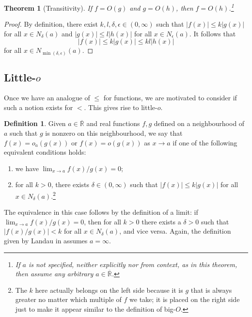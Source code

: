\documentclass{article}
\newtheorem{theorem}{Theorem}
\theoremstyle{definition}
\newtheorem{definition}{Definition}
\newcommand\RRE{\overline{\mathbb R}}
\newcommand\abs[1]{\left\lvert#1\right\rvert}
\begin{document}
\begin{theorem}[Transitivity]
    If \(f = O(g)\) and \(g = O(h)\), then \(f = O(h)\).\footnote{If \(a\) is not specified, neither explicitly nor from context, as in this theorem, then assume any arbitrary \(a\in\RRE\).}
\end{theorem}

\begin{proof}
    By definition, there exist \(k,l,\delta,\epsilon\in(0,\infty)\) such that \(\abs{f(x)} \leq k\abs{g(x)}\) for all \(x\in N_{\delta}(a)\) and \(\abs{g(x)} \leq l\abs{h(x)}\) for all \(x\in N_{\epsilon}(a)\).
    It follows that
    \[\abs{f(x)} \leq k\abs{g(x)} \leq kl\abs{h(x)}\]
    for all \(x\in N_{\min(\delta,\epsilon)}(a)\).
\end{proof}

\subsection{Little-$o$}\label{ssec:littleo}

Once we have an analogue of \(\leq\) for functions, we are motivated to consider if such a notion exists for \(<\).
This gives rise to little-\(o\).

\begin{definition}
    Given \(a\in\RRE\) and real functions \(f,g\) defined on a neighbourhood of \(a\) such that \(g\) is nonzero on this neighbourhood, we say that \(f(x) = o_a(g(x))\) or \(f(x) = o(g(x))\) as \(x\to a\) if one of the following equivalent conditions holds:
    \begin{enumerate}
        \item we have \(\lim_{x\to a} f(x)/g(x) = 0\);
        \item for all \(k>0\), there exists \(\delta\in(0,\infty)\) such that \(\abs{f(x)} \leq k\abs{g(x)}\) for all \(x\in N_{\delta}(a)\).\footnote{The \(k\) here actually belongs on the left side because it is \(g\) that is always greater no matter which multiple of \(f\) we take; it is placed on the right side just to make it appear similar to the definition of big-$O$.}
    \end{enumerate}
\end{definition}

The equivalence in this case follows by the definition of a limit: if \(\lim_{x\to a} f(x)/g(x) = 0\), then for all \(k>0\) there exists a \(\delta > 0\) such that \(\abs{f(x)/g(x)} < k\) for all \(x\in N_{\delta}(a)\), and vice versa.
Again, the definition given by Landau in \cite{Landau1909} assumes \(a=\infty\).
\end{document}
